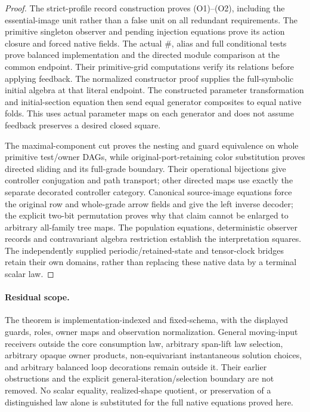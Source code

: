 \documentclass[11pt]{article}
\begin{document}
\begin{proof}
The strict-profile record construction proves (O1)--(O2), including the essential-image unit rather than a false unit on all redundant requirements. The primitive singleton observer and pending injection equations prove its action closure and forced native fields. The actual $\#$, alias and full conditional tests prove balanced implementation and the directed module comparison at the common endpoint. Their primitive-grid computations verify its relations before applying feedback. The normalized constructor proof supplies the full-symbolic initial algebra at that literal endpoint. The constructed parameter transformation and initial-section equation then send equal generator composites to equal native folds. This uses actual parameter maps on each generator and does not assume feedback preserves a desired closed square.

The maximal-component cut proves the nesting and guard equivalence on whole primitive test/owner DAGs, while original-port-retaining color substitution proves directed sliding and its full-grade boundary. Their operational bijections give controller conjugation and path transport; other directed maps use exactly the separate decorated controller category. Canonical source-image equations force the original row and whole-grade arrow fields and give the left inverse decoder; the explicit two-bit permutation proves why that claim cannot be enlarged to arbitrary all-family tree maps. The population equations, deterministic observer records and contravariant algebra restriction establish the interpretation squares. The independently supplied periodic/retained-state and tensor-clock bridges retain their own domains, rather than replacing these native data by a terminal scalar law.\end{proof}

\paragraph{Residual scope.}
The theorem is implementation-indexed and fixed-schema, with the displayed guards, roles, owner maps and observation normalization. General moving-input receivers outside the core consumption law, arbitrary span-lift law selection, arbitrary opaque owner products, non-equivariant instantaneous solution choices, and arbitrary balanced loop decorations remain outside it. Their earlier obstructions and the explicit general-iteration/selection boundary are not removed. No scalar equality, realized-shape quotient, or preservation of a distinguished law alone is substituted for the full native equations proved here.
\end{document}
